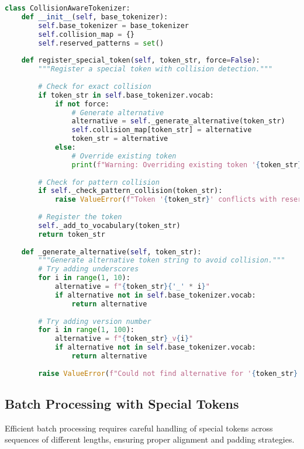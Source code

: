\begin{lstlisting}[language=Python, caption=Collision detection and resolution]
class CollisionAwareTokenizer:
    def __init__(self, base_tokenizer):
        self.base_tokenizer = base_tokenizer
        self.collision_map = {}
        self.reserved_patterns = set()
        
    def register_special_token(self, token_str, force=False):
        """Register a special token with collision detection."""
        
        # Check for exact collision
        if token_str in self.base_tokenizer.vocab:
            if not force:
                # Generate alternative
                alternative = self._generate_alternative(token_str)
                self.collision_map[token_str] = alternative
                token_str = alternative
            else:
                # Override existing token
                print(f"Warning: Overriding existing token '{token_str}'")
                
        # Check for pattern collision
        if self._check_pattern_collision(token_str):
            raise ValueError(f"Token '{token_str}' conflicts with reserved pattern")
            
        # Register the token
        self._add_to_vocabulary(token_str)
        return token_str
        
    def _generate_alternative(self, token_str):
        """Generate alternative token string to avoid collision."""
        # Try adding underscores
        for i in range(1, 10):
            alternative = f"{token_str}{'_' * i}"
            if alternative not in self.base_tokenizer.vocab:
                return alternative
                
        # Try adding version number
        for i in range(1, 100):
            alternative = f"{token_str}_v{i}"
            if alternative not in self.base_tokenizer.vocab:
                return alternative
                
        raise ValueError(f"Could not find alternative for '{token_str}'")
\end{lstlisting}

\subsection{Batch Processing with Special Tokens}

Efficient batch processing requires careful handling of special tokens across sequences of different lengths, ensuring proper alignment and padding strategies.

